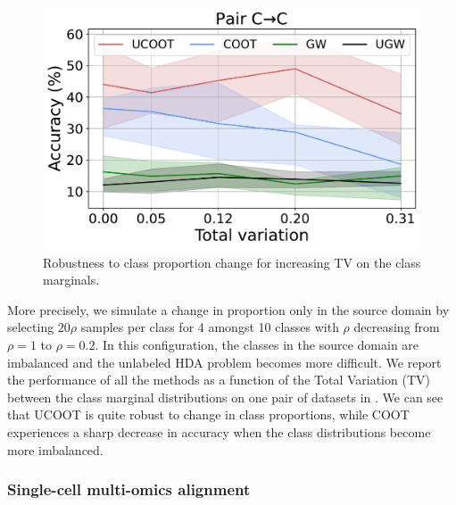 \begin{figure}
  \centering
  \vspace{-10pt}
  \includegraphics[width=\linewidth]{./Chapitre3/fig/summary_C_C.pdf}
  \vspace*{-7mm}
  \caption{Robustness to class proportion change for increasing TV on the class marginals.
  \label{f:hda_prop}}
\end{figure}
More precisely, we simulate a change in proportion only in the source domain
by selecting $20\rho$ samples per class for 4 amongst 10 classes with $\rho$
decreasing from $\rho=1$ to $\rho=0.2$. In this configuration,
the classes in the source domain are imbalanced and the unlabeled HDA problem becomes more difficult.
We report the performance of all the methods as a function of the Total Variation (TV)
between the class marginal distributions on one pair of datasets in .
We can see that UCOOT is quite robust to change in class proportions,
while COOT experiences a sharp decrease in accuracy when the class distributions
become more imbalanced.

%
\subsubsection{Single-cell multi-omics alignment}

